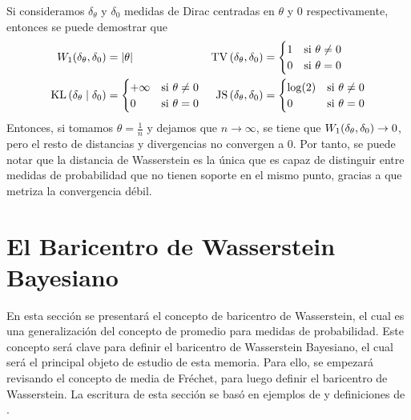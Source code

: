 {{{\begin{example}
				Si consideramos $\delta_\theta$ y $\delta_0$ medidas de Dirac centradas en $\theta$ y $0$ respectivamente, entonces se puede demostrar que
				\begin{align*}
					\Wasserstein[1]{\delta_\theta}{\delta_0} & = |\theta|                            &
					\TV{\delta_\theta}{\delta_0}             & = \begin{cases}
						                                             1 & \text{si } \theta \neq 0 \\
						                                             0 & \text{si } \theta = 0
					                                             \end{cases}          \\
					\KL{\delta_\theta}{\delta_0}             & = \begin{cases}
						                                             +\infty & \text{si } \theta \neq 0 \\
						                                             0       & \text{si } \theta = 0
					                                             \end{cases} &
					\JS{\delta_\theta}{\delta_0}             & = \begin{cases}
						                                             \log(2) & \text{si } \theta \neq 0 \\
						                                             0       & \text{si } \theta = 0
					                                             \end{cases}
				\end{align*}
				Entonces, si tomamos $\theta = \frac{1}{n} $ y dejamos que $n \to \infty$, se tiene que $\Wasserstein[1]{\delta_\theta}{\delta_0} \to 0$, pero el resto de distancias y divergencias no convergen a 0.
				Por tanto, se puede notar que la distancia de Wasserstein es la única que es capaz de distinguir entre medidas de probabilidad que no tienen soporte en el mismo punto, gracias a que metriza la convergencia débil.
			\end{example}

		}  %

		\section{El Baricentro de Wasserstein Bayesiano}\label{sec:el-baricentro-de-Wasserstein-Bayesiano}
		{
			En esta sección se presentará el concepto de baricentro de Wasserstein, el cual es una generalización del concepto de promedio para medidas de probabilidad. Este concepto será clave para definir el baricentro de Wasserstein Bayesiano, el cual será el principal objeto de estudio de esta memoria. Para ello, se empezará revisando el concepto de media de Fréchet, para luego definir el baricentro de Wasserstein. La escritura de esta sección se basó en ejemplos de \cite{panaretos2020invitation} y definiciones de \cite{peyre2019computational}.

}}}
